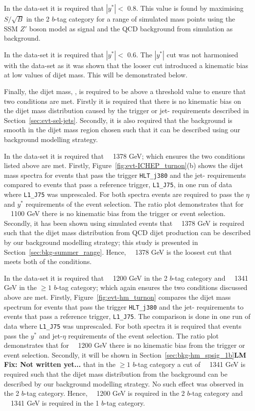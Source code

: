 In the \hm{} data-set it is required that $|y^*| <$ 0.8.
This value is found by maximising $S/\sqrt{B}$ in the 2 $b$-tag category for a range of simulated mass points
using the SSM $Z'$ boson model as signal and the QCD background from simulation as background.

In the \lm{} data-set it is required that $|y^*| <$ 0.6.
The $|y^*|$ cut was not harmonised with the \hm{} data-set
as it was shown that the looser cut introduced a kinematic bias at low values of dijet mass.
This will be demonstrated below.

Finally, the dijet mass, \mjj{}, is required to be above a threshold value to ensure that two conditions are met.
Firstly it is required that there is no kinematic bias on the dijet mass distribution
caused by the trigger or jet-\pT{} requirements described in Section~\ref{sec:evt-sel-jets}.
Secondly, it is also required that the background is smooth in the dijet mass region chosen
such that it can be described using our background modelling strategy.

In the \summer{} data-set it is required that \mjj~\gt~1378 GeV;
which ensures the two conditions listed above are met.
Firstly, Figure~\ref{fig:evt-ICHEP_turnon}(b) shows the dijet mass spectra for events
that pass the trigger \verb|HLT_j380| and the \summer{} jet-\pT{} requirements
compared to events that pass a reference trigger, \verb|L1_J75|,
in one run of data where \verb|L1_J75| was unprescaled.
For both spectra events are required to pass the $\eta$ and $y^*$ requirements of the \summer{} event selection.
The ratio plot demonstrates that for \mjj~\gt~1100 GeV there is no kinematic bias from the trigger or event selection.
Secondly, it has been shown using simulated events that
\mjj~\gt~1378 GeV is required such that the dijet mass distribution from QCD dijet production
can be described by our background modelling strategy;
this study is presented in Section~\ref{sec:bkg-summer_range}.
Hence, \mjj~\gt~1378 GeV is the loosest cut that meets both of the conditions.

In the \hm{} data-set it is required that \mjj~\gt~1200 GeV in the 2 $b$-tag category and
\mjj~\gt~1341 GeV in the $\geq1$ $b$-tag category;
which again ensures the two conditions discussed above are met.
Firstly, Figure~\ref{fig:evt-hm_turnon} compares the dijet mass spectrum
for events that pass the trigger \verb|HLT_j380| and the \hm{} jet-\pT{} requirements
to events that pass a reference trigger, \verb|L1_J75|.
The comparison is done in one run of data where \verb|L1_J75| was unprescaled.
For both spectra it is required that events pass the $y^*$ and jet-$\eta$ requirements of the \hm{} event selection.
The ratio plot demonstrates that for \mjj~\gt~1200 GeV there is no kinematic bias from the trigger or event selection.
Secondly, it will be shown in Section~\ref{sec:bkg-hm_spsig_1b}\textbf{LM Fix: Not written yet...}
that in the $\geq1$ $b$-tag category a cut of \mjj~\gt~1341 GeV is required such that the
dijet mass distribution from the background can be described by our background modelling strategy.
No such effect was observed in the 2 $b$-tag category.
Hence, \mjj~\gt~1200 GeV is required in the 2 $b$-tag category and
\mjj~\gt~1341 GeV is required in the 1 $b$-tag category.


